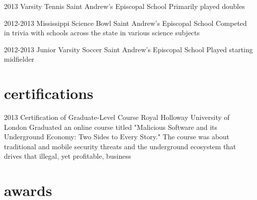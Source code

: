 \documentclass[]{friggeri-cv} %
\begin{document}
\begin{entrylist}

\entry
{2013}
{Varsity Tennis}
{Saint Andrew's Episcopal School}
{Primarily played doubles}


\entry
{2012-2013}
{Mississippi Science Bowl}
{Saint Andrew's Episcopal School}
{Competed in trivia with schools across the state in various science subjects}


\entry
{2012-2013}
{Junior Varsity Soccer}
{Saint Andrew's Episcopal School}
{Played starting midfielder}


\end{entrylist}


\section{certifications}

\begin{entrylist}
	

\entry
{2013}
{Certification of Graduate-Level Course}
{Royal Holloway University of London}
{Graduated an online course titled "Malicious Software and its Underground Economy: Two Sides to Every Story." The course was about traditional and mobile security threats and the underground ecosystem that drives that illegal, yet profitable, business}

	
\end{entrylist} 

\pagebreak

\section{awards}
\end{document}
